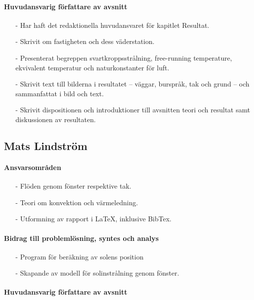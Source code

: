 \documentclass[12pt,a4paper]{article}
\begin{document}
\paragraph{Huvudansvarig författare av avsnitt}
\begin{itemize}
\item[-] Har haft det redaktionella huvudansvaret för kapitlet Resultat.
\item[-] Skrivit om fastigheten och dess väderstation.
\item[-] Presenterat begreppen svartkroppsstrålning, free-running temperature, ekvivalent temperatur och naturkonstanter för luft.
\item[-] Skrivit text till bilderna i resultatet – väggar, burspråk, tak och grund – och sammanfattat i bild och text.
\item[-] Skrivit dispositionen och introduktioner till avsnitten teori och resultat samt diskussionen av resultaten.
\end{itemize}


\subsection*{Mats Lindström}

\paragraph{Ansvarsområden}

\begin{itemize}
\item[-] Flöden genom fönster respektive tak.
\item[-] Teori om konvektion och värmeledning.
\item[-] Utformning av rapport i \LaTeX, inklusive BibTex.
\end{itemize}

\paragraph{Bidrag till problemlösning, syntes och analys}

\begin{itemize}
\item[-] Program för beräkning av solens position
\item[-] Skapande av modell för solinstrålning genom fönster.
\end{itemize}

\paragraph{Huvudansvarig författare av avsnitt}
\end{document}

